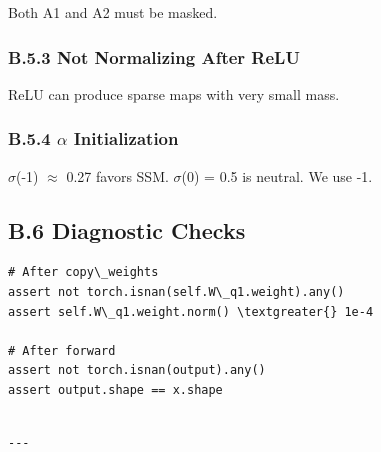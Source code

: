 Both A1 and A2 must be masked.

\subsubsection{B.5.3 Not Normalizing After ReLU}

ReLU can produce sparse maps with very small mass.

\subsubsection{B.5.4 $\alpha$ Initialization}

$\sigma$(-1) $\approx$ 0.27 favors SSM. $\sigma$(0) = 0.5 is neutral. We use -1.

\subsection{B.6 Diagnostic Checks}

\begin{lstlisting}
# After copy\_weights
assert not torch.isnan(self.W\_q1.weight).any()
assert self.W\_q1.weight.norm() \textgreater{} 1e-4

# After forward
assert not torch.isnan(output).any()
assert output.shape == x.shape
\end{lstlisting}
\begin{lstlisting}

---
\end{lstlisting}